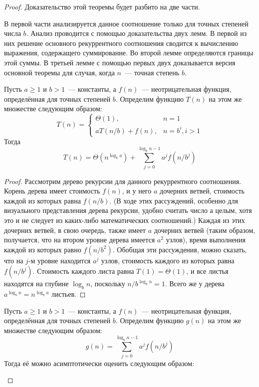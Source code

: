 \documentclass[a4paper,12pt]{article}
\begin{document}
\begin{proof}
	Доказательство этой теоремы будет разбито на две части. 
	
	В первой части анализируется данное соотношение только для точных степеней числа $b$. Анализ проводится с помощью доказательства двух лемм. В первой из них
	решение основного рекуррентного соотношения сводится к вычислению выражения, содержащего суммирование. Во второй лемме определяются границы этой суммы. В третьей лемме с помощью первых двух доказывается версия основной
	теоремы для случая, когда $n$~--- точная степень $b$.
	
	\begin{lemma}
		Пусть $a \geqslant 1$ и $b > 1$~--- константы, а $f(n)$~--- неотрицательная функция, определённая для точных степеней $b$. Определим функцию $T(n)$ на этом же множестве следующим образом:
		\[T(n) = \begin{cases}
		\Theta(1), & n = 1 \\
		aT(n/b) + f(n), & n = b^i, i > 1
		\end{cases}\]
		Тогда \[T(n) = \Theta(n^{\log_b a}) + \sum_{j = 0}^{\log_b n - 1}a^j f(n/b^j)\]
	\end{lemma}
	\begin{proof}
		Рассмотрим дерево рекурсии для данного рекуррентного соотношения. Корень дерева имеет стоимость $f(n)$, и у него $a$ дочерних ветвей, стоимость каждой из которых равна $f(n/b)$. (В ходе этих рассуждений, особенно для
		визуального представления дерева рекурсии, удобно считать число а целым, хотя это и не следует из каких-либо математических соотношений.) Каждая из этих
		дочерних ветвей, в свою очередь, также имеет $a$ дочерних ветвей (таким образом, получается, что на втором уровне дерева имеется $a^2$ узлов), время выполнения каждой из которых равно $f(n/b^2)$. Обобщая эти рассуждения, можно сказать, что на $j$-м уровне находится $a^j$ узлов, стоимость каждого из которых равна $f(n/b^j)$. Стоимость каждого листа равна $T(1) = \Theta(1)$, и все листья находятся на глубине $\log_b n$, поскольку $n/b^{\log_b n} = 1$. Всего же у дерева $a^{\log_b n} = n^{\log_b a}$ листьев.
	\end{proof}
	\begin{lemma}
		Пусть $a \geqslant 1$ и $b > 1$~--- константы, а $f(n)$~--- неотрицательная функция, определённая для точных степеней $b$. Определим функцию $g(n)$ на этом же множестве следующим образом:
		\[g(n) = \sum_{j = 0}^{\log_b n - 1}a^j f(n/b^j)\]
		Тогда её можно асимптотически оценить следующим образом:
		\begin{enumerate}

\end{enumerate}
\end{lemma}
\end{proof}
\end{document}
